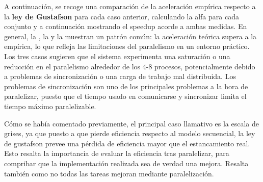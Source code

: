 \newpage
A continuación, se recoge una comparación de la aceleración empírica respecto a la \textbf{ley de Gustafson} para cada caso anterior, calculando la alfa para cada conjunto y a continuación mostrando el speedup acorde a ambas medidas.
En general, la , la  y la  muestran un patrón común: la aceleración teórica supera a la empírica, lo que refleja las limitaciones del paralelismo en un entorno práctico. 
Los tres casos sugieren que el sistema experimenta una saturación o una reducción en el paralelismo alrededor de los 4-8 procesos, potencialmente debido a problemas de sincronización o una carga de trabajo mal distribuida. 
Los problemas de sincronización son uno de los principales problemas a la hora de paralelizar, puesto que el tiempo usado en comunicarse y sincronizar limita el tiempo máximo paralelizable.

Cómo se había comentado previamente, el principal caso llamativo es la escala de grises, ya que puesto a que pierde eficiencia respecto al modelo secuencial, la ley de gustafson prevee una pérdida de eficiencia mayor que el estancamiento real. 
Esto resalta la importancia de evaluar la eficiencia tras paralelizar, para compribar que la implementación realizada sea de verdad una mejora. 
Resalta también como no todas las tareas mejoran mediante paralelización.

